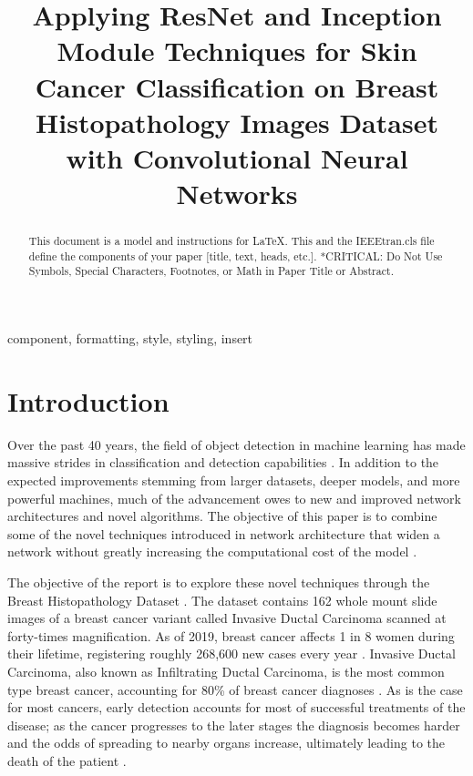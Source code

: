 \documentclass[conference]{IEEEtran}
\begin{document}


\title{Applying ResNet and Inception Module Techniques for Skin Cancer Classification on Breast Histopathology Images Dataset with Convolutional Neural Networks\\
}

\author{
}

\maketitle

\begin{abstract}
This document is a model and instructions for \LaTeX.
This and the IEEEtran.cls file define the components of your paper [title, text, heads, etc.]. *CRITICAL: Do Not Use Symbols, Special Characters, Footnotes, 
or Math in Paper Title or Abstract.
\end{abstract}

\begin{IEEEkeywords}
component, formatting, style, styling, insert
\end{IEEEkeywords}

\section{Introduction}
Over the past 40 years, the field of object detection in machine learning has made massive strides in classification and detection capabilities \cite{Fukushima1980}. In addition to the expected improvements stemming from larger datasets, deeper models, and more powerful machines, much of the advancement owes to new and improved network architectures and novel algorithms. The objective of this paper is to combine some of the novel techniques introduced in network architecture that widen a network without greatly increasing the computational cost of the model \cite{He2016, Szegedy2014}.

The objective of the report is to explore these novel techniques through the Breast Histopathology Dataset \cite{Mooney2017}. The dataset contains 162 whole mount slide images of a breast cancer variant called Invasive Ductal Carcinoma scanned at forty-times magnification. As of 2019, breast cancer affects 1 in 8 women during their lifetime, registering roughly 268,600 new cases every year \cite{DeSantis2019}. Invasive Ductal Carcinoma, also known as Infiltrating Ductal Carcinoma, is the most common type breast cancer, accounting for 80\% of breast cancer diagnoses \cite{Sharma2010}. As is the case for most cancers, early detection accounts for most of successful treatments of the disease; as the cancer progresses to the later stages the diagnosis becomes harder and the odds of spreading to nearby organs increase, ultimately leading to the death of the patient \cite{Milosevic2018}.
\end{document}
